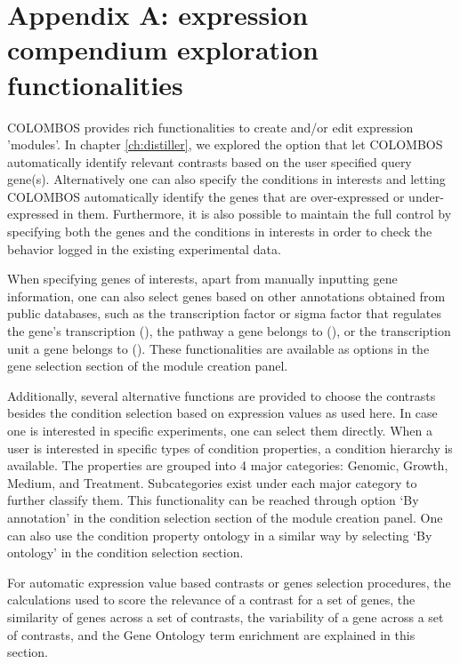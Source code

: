 \chapter{Appendix A: expression compendium exploration 
functionalities}\label{ch:apd-colombos}

\instructionsappendices

COLOMBOS provides rich functionalities to create and/or edit
expression 'modules'. In chapter \ref{ch:distiller}, we explored the
option that let COLOMBOS automatically identify relevant contrasts
based on the user specified query gene(s).
%
Alternatively one can also specify the conditions in interests and
letting COLOMBOS automatically identify the genes that are
over-expressed or under-expressed in them.  Furthermore, it is also
possible to maintain the full control by specifying both the genes and
the conditions in interests in order to check the behavior logged in
the existing experimental data.

When specifying genes of interests, apart from manually inputting gene
information, one can also select genes based on other annotations
obtained from public databases, such as the transcription factor or
sigma factor that regulates the gene’s transcription
(\cite{Gama-Castro2008}), the pathway a gene belongs to
(\cite{Karp2005}), or the transcription unit a gene belongs to
(\cite{Karp2005}).  These functionalities are available as options in
the gene selection section of the module creation panel.

Additionally, several alternative functions are provided to choose the
contrasts besides the condition selection based on expression values
as used here. In case one is interested in specific experiments, one
can select them directly. When a user is interested in specific types
of condition properties, a condition hierarchy is available. The
properties are grouped into 4 major categories: Genomic, Growth,
Medium, and Treatment.  Subcategories exist under each major category
to further classify them.  This functionality can be reached through
option `By annotation' in the condition selection section of the
module creation panel.  One can also use the condition property
ontology in a similar way by selecting `By ontology' in the condition
selection section.

For automatic expression value based contrasts or genes selection
procedures, the calculations used to score the relevance of a contrast
for a set of genes, the similarity of genes across a set of contrasts,
the variability of a gene across a set of contrasts, and the Gene
Ontology term enrichment are explained in this section.

